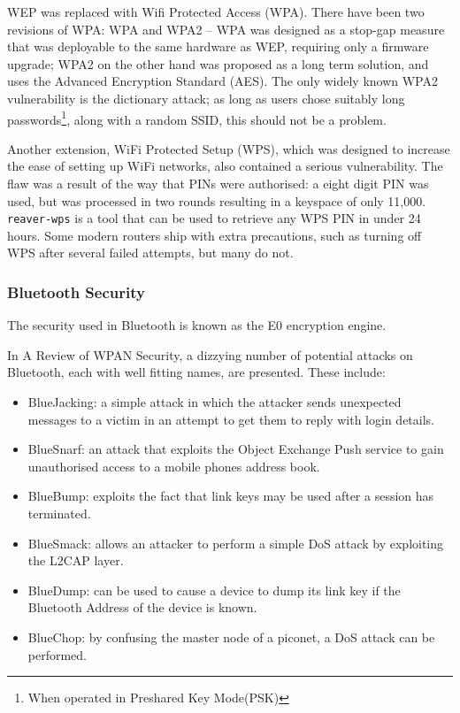 \documentclass[10pt,journal,compsoc]{IEEEtran}
\begin{document}
WEP was replaced with Wifi Protected Access (WPA). There have been two
revisions of WPA: WPA and WPA2 -- WPA was designed as a stop-gap measure that
was deployable to the same hardware as WEP, requiring only a firmware upgrade;
WPA2 on the other hand was proposed as a long term solution, and uses the
Advanced Encryption Standard (AES). The only widely known WPA2 vulnerability is
the dictionary attack; as long as users chose suitably long
passwords\footnote{When operated in Preshared Key Mode(PSK)}, along with a
random SSID, this should not be a problem. 

Another extension, WiFi Protected Setup (WPS), which was designed to increase
the ease of setting up WiFi networks, also contained a serious vulnerability.
The flaw was a result of the way that PINs were authorised: a eight digit PIN
was used, but was processed in two rounds resulting in a keyspace of only
11,000. {\tt reaver-wps} is a tool that can be used to retrieve any WPS PIN in
under 24 hours. Some modern routers ship with extra precautions, such as
turning off WPS after several failed attempts, but many do not. 

\subsubsection{Bluetooth Security}
The security used in Bluetooth is known as the E0 encryption engine. 

In A Review of WPAN Security\cite{Kennedy2008}, a dizzying number of potential
attacks on Bluetooth, each with well fitting names, are presented. These include: 
\begin{itemize}
\item BlueJacking: a simple attack in which the attacker sends unexpected
messages to a victim in an attempt to get them to reply with login details. 
\item BlueSnarf: an attack that exploits the Object Exchange Push service to
gain unauthorised access to a mobile phones address book. 
\item BlueBump: exploits the fact that link keys may be used after a session
has terminated. 
\item BlueSmack: allows an attacker to perform a simple DoS attack by
exploiting the L2CAP layer.
\item BlueDump: can be used to cause a device to dump its link key if the
Bluetooth Address of the device is known. 
\item BlueChop: by confusing the master node of a piconet, a DoS attack can be
performed. 
\end{itemize}
\end{document}
